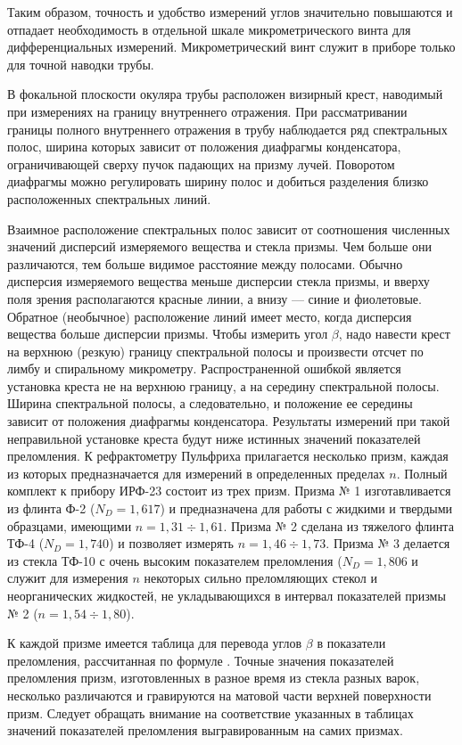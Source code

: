 Таким образом, точность и удобство измерений углов значительно
повышаются и отпадает необходимость в отдельной шкале
микрометрического винта для дифференциальных измерений.
Микрометрический винт служит в приборе только для точной наводки
трубы.

В фокальной плоскости окуляра трубы расположен визирный крест,
наводимый при измерениях на границу внутреннего отражения. При
рассматривании границы полного внутреннего отражения в трубу
наблюдается ряд спектральных полос, ширина которых зависит от
положения диафрагмы конденсатора, ограничивающей сверху пучок
падающих на призму лучей. Поворотом диафрагмы можно регулировать
ширину полос и добиться разделения близко расположенных
спектральных линий.

Взаимное расположение спектральных полос зависит от соотношения
численных значений дисперсий измеряемого вещества и стекла призмы.
Чем больше они различаются, тем больше видимое расстояние между
полосами. Обычно дисперсия измеряемого вещества меньше дисперсии
стекла призмы, и вверху поля зрения располагаются красные линии, а
внизу --- синие и фиолетовые. Обратное (необычное) расположение
линий имеет место, когда дисперсия вещества больше дисперсии
призмы. Чтобы измерить угол $\beta$, надо навести крест на верхнюю
(резкую) границу спектральной полосы и произвести отсчет по лимбу
и спиральному микрометру. Распространенной ошибкой является
установка креста не на верхнюю границу, а на середину спектральной
полосы. Ширина спектральной полосы, а следовательно, и положение
ее середины зависит от положения диафрагмы конденсатора.
Результаты измерений при такой неправильной установке креста будут
ниже истинных значений показателей преломления. К рефрактометру
Пульфриха прилагается несколько призм, каждая из которых
предназначается для измерений в определенных пределах $n$. Полный
комплект к прибору ИРФ-23 состоит из трех призм. Призма № 1
изготавливается из флинта Ф-2 ($N_D=1,617$) и предназначена для
работы с жидкими и твердыми образцами, имеющими $n=1,31\div 1,61$.
Призма № 2 сделана из тяжелого флинта ТФ-4 ($N_D=1,740$) и
позволяет измерять $n=1,46\div 1,73$. Призма № 3 делается из
стекла ТФ-10 с очень высоким показателем преломления ($N_D=1,806$
и служит для измерения $n$ некоторых сильно преломляющих стекол и
неорганических жидкостей, не укладывающихся в интервал показателей
призмы № 2 ($n=1,54\div 1,80$).

К каждой призме имеется таблица для перевода углов $\beta$ в
показатели преломления, рассчитанная по формуле . Точные
значения показателей преломления призм, изготовленных в разное
время из стекла разных варок, несколько различаются и гравируются
на матовой части верхней поверхности призм. Следует обращать
внимание на соответствие указанных в таблицах значений показателей
преломления выгравированным на самих призмах.

